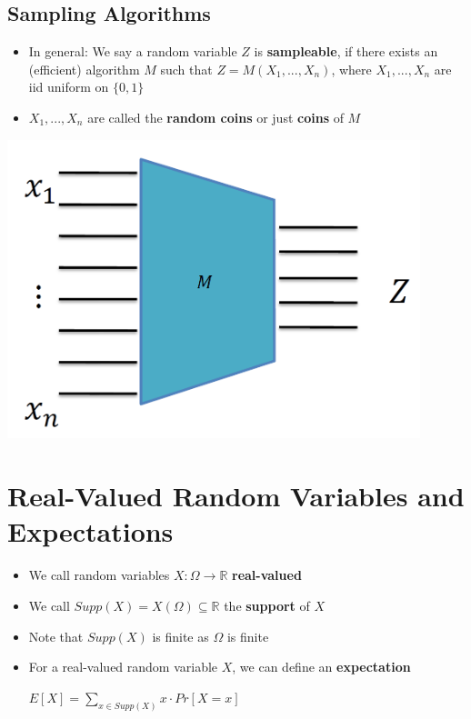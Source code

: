 		\subsection{Sampling Algorithms}
			\begin{itemize}
				\item In general: We say a random variable $Z$ is \textbf{sampleable}, if there exists an (efficient) algorithm $M$ such that
				$Z = M(X_1,...,X_n)$, where $X_1,...,X_n$ are iid uniform on $\{0,1\}$
				\item $X_1,...,X_n$ are called the \textbf{random coins} or just \textbf{coins} of $M$
			\end{itemize}
			\begin{center}
            	\includegraphics[width=120mm]{Graphics/Probability Theory/SamplingAlgorithms.png}\newline
        	\end{center}
        
	\section{Real-Valued Random Variables and Expectations}
		\begin{itemize}
			\item We call random variables $X: \Omega \to \mathbb{R}$ \textbf{real-valued}
			\item We call $Supp(X) = X(\Omega) \subseteq \mathbb{R}$ the \textbf{support} of $X$
			\item Note that $Supp(X)$ is finite as $\Omega$ is finite
			\item For a real-valued random variable $X$, we can define an \textbf{expectation}
				\begin{center}
					$E[X] = \sum\limits_{x \in Supp(X)} x \cdot Pr[X=x]$
				\end{center}
		\end{itemize}
		
